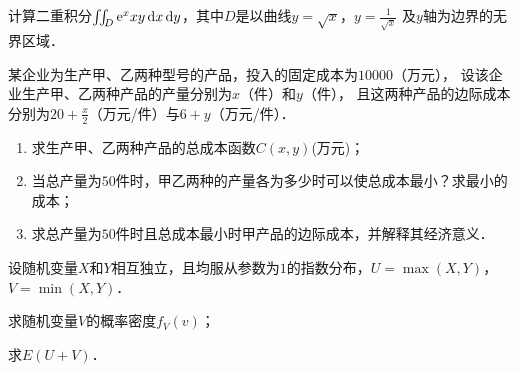 \documentclass[plain,noanswer,medmath]{../../template/jnuexam}
\begin{document}
\begin{problem}[points=10]
计算二重积分$\iint_D \mathrm{e}^x xy\mathop{}\!\mathrm{d} x\mathop{}\!\mathrm{d} y$，其中$D$是以曲线$y = \sqrt{x}$，$y = \frac{1}{\sqrt{x}}$
及$y$轴为边界的无界区域．
\end{problem}


\begin{problem}[points=10]
某企业为生产甲、乙两种型号的产品，投入的固定成本为$10000$（万元），
设该企业生产甲、乙两种产品的产量分别为$x$（件）和$y$（件），
且这两种产品的边际成本分别为$20 + \frac{x}{2}$（万元/件）与$6 + y$（万元/件）．
\begin{enumerate}
\item 求生产甲、乙两种产品的总成本函数$C(x,y)$(万元)；
\item 当总产量为$50$件时，甲乙两种的产量各为多少时可以使总成本最小？求最小的成本；
\item 求总产量为$50$件时且总成本最小时甲产品的边际成本，并解释其经济意义．
\end{enumerate}
\end{problem}












\begin{problem}[points=10]
设随机变量$X$和$Y$相互独立，且均服从参数为$1$的指数分布，$U = \max(X,Y)$，$V = \min(X,Y)$．\par
\begin{enumerate*}
\item 求随机变量$V$的概率密度$f_V(v)$；
\item 求$E\left(U + V \right)$．
\end{enumerate*}
\end{problem}
\end{document}
